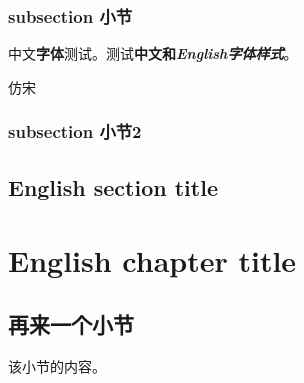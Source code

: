 \documentclass[a4paper,twoside]{ctexbook}
\begin{document}
\lipsum[3-5]

\subsection{subsection 小节}

中文\textbf{字体}测试。测试\textbf{中文和\textit{English字体样式}}。

{\fzfs 仿宋}

\subsection{subsection 小节2}


\section{English section title}

\lipsum[2-5]

\chapter{English chapter title}

\hfill
\begin{minipage}[H]{.65\linewidth}
{
  \hypersetup{hidelinks}
  \startcontents[chapters]
}
\end{minipage}
\hspace{1em}

\vspace{10ex}

\lipsum[3]

\clearpage

\section{再来一个小节}

该小节的内容。
\end{document}

